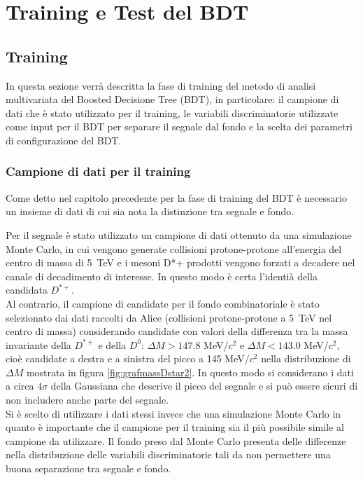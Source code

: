 \chapter{Training e Test del BDT}



\section{Training}

In questa sezione verr\`a descritta la fase di training del metodo di analisi multivariata del Boosted Decisione Tree (BDT), in particolare: il campione di dati che \`e stato utilizzato per il training, le variabili discriminatorie utilizzate come input per il BDT per separare il segnale dal fondo e la scelta dei parametri di configurazione del BDT. 

\subsection{Campione di dati per il training}
Come detto nel capitolo precedente per la fase di training del BDT è necessario un insieme di dati di cui sia nota la distinzione tra segnale e fondo. 

Per il segnale è stato utilizzato un campione di dati ottenuto da una simulazione Monte Carlo,  in cui vengono generate collisioni protone-protone all'energia del centro di massa di 5~TeV e i mesoni D*+ prodotti vengono forzati a decadere nel canale di decadimento di interesse. In questo modo \`e certa l'identi\`a della candidata $D^{*+}$.
\\Al contrario, il campione di candidate per il fondo combinatoriale \`e stato selezionato dai dati raccolti da Alice\cite{dati_ALICE} (collisioni protone-protone a 5~TeV nel centro di massa) considerando candidate con valori della differenza tra la massa invariante della $D^{*+}$ e della $D^0$: $\Delta M > 147.8$ MeV/$c^2$  e $\Delta M < 143.0$ MeV/$c^2$, cio\`e candidate a destra e a sinistra del picco a 145 MeV/$c^2$ nella distribuzione di $\Delta M$ mostrata in figura \ref{fig:grafmassDstar2}. In questo modo si considerano i dati a circa $4 \sigma$ della Gaussiana che descrive il picco del segnale e si pu\`o essere sicuri di non includere anche parte del segnale.
\\Si \`e scelto di utilizzare i dati stessi invece che una simulazione Monte Carlo in quanto \`e importante che il campione per il training sia il pi\`u possibile simile al campione da utilizzare. Il fondo preso dal Monte Carlo presenta delle differenze nella distribuzione delle variabili discriminatorie tali da non permettere una buona separazione tra segnale e fondo.

